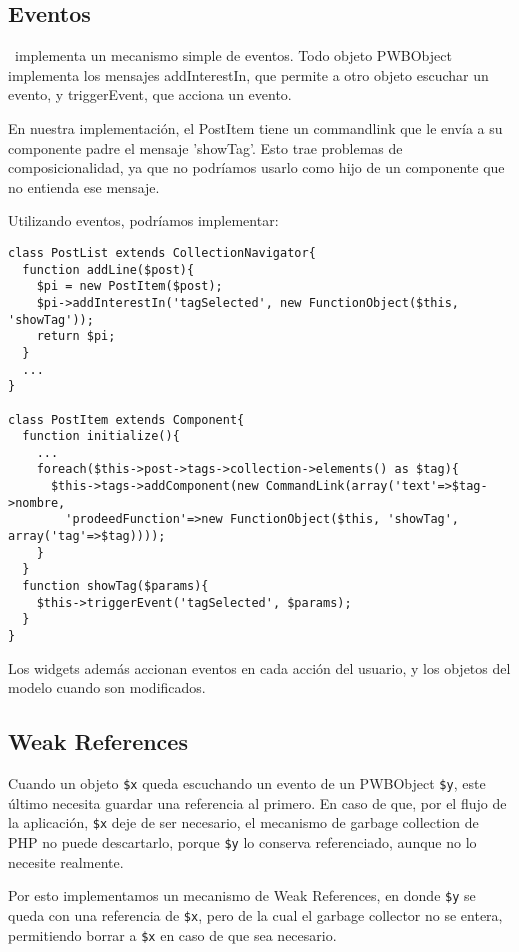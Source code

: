 \subsection{Eventos}
\label{sub-events}
\PWB \ implementa un mecanismo simple de eventos. Todo objeto PWBObject implementa los mensajes addInterestIn, que permite a otro objeto escuchar un evento, y triggerEvent, que acciona un evento.

En nuestra implementación, el PostItem tiene un commandlink que le envía a su componente padre el mensaje 'showTag'. Esto trae problemas de composicionalidad, ya que no podríamos usarlo como hijo de un componente que no entienda ese mensaje.

Utilizando eventos, podríamos implementar:

\begin{verbatim}
class PostList extends CollectionNavigator{
  function addLine($post){
    $pi = new PostItem($post);
    $pi->addInterestIn('tagSelected', new FunctionObject($this, 'showTag'));
    return $pi;
  }
  ...
}

class PostItem extends Component{
  function initialize(){
    ...
    foreach($this->post->tags->collection->elements() as $tag){
      $this->tags->addComponent(new CommandLink(array('text'=>$tag->nombre,
        'prodeedFunction'=>new FunctionObject($this, 'showTag', array('tag'=>$tag))));
    }
  }
  function showTag($params){
    $this->triggerEvent('tagSelected', $params);
  }
}

\end{verbatim}

Los widgets además accionan eventos en cada acción del usuario, y los objetos del modelo cuando son modificados.


\subsection{Weak References}
\label{sub-weak}
Cuando un objeto \verb"$x" queda escuchando un evento de un PWBObject \verb"$y", este último necesita guardar una referencia al primero. En caso de que, por el flujo de la aplicación, \verb'$x' deje de ser necesario, el mecanismo de garbage collection de PHP no puede descartarlo, porque \verb'$y' lo conserva referenciado, aunque no lo necesite realmente.

Por esto implementamos un mecanismo de Weak References, en donde \verb"$y" se queda con una referencia de \verb"$x", pero de la cual el garbage collector no se entera, permitiendo borrar a \verb"$x" en caso de que sea necesario.



